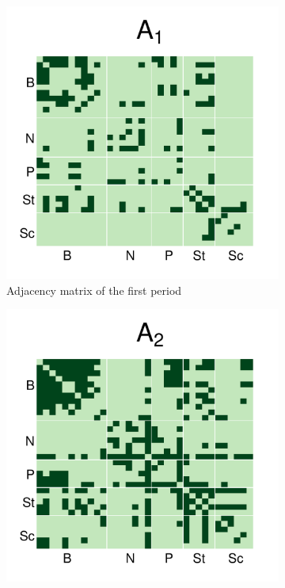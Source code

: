 \documentclass[12pt]{article}
\begin{document}
\begin{figure}[H]
	\centering
	\begin{subfigure}[b]{0.45\textwidth}
		\includegraphics[width=\textwidth]{../Figure/Adj0.pdf}
		\caption{Adjacency matrix of the first period}
		\label{fig:adj0}
	\end{subfigure}
	\begin{subfigure}[b]{0.45\textwidth}
		\includegraphics[width=\textwidth]{../Figure/Adj1.pdf}

\end{subfigure}
\end{figure}
\end{document}
